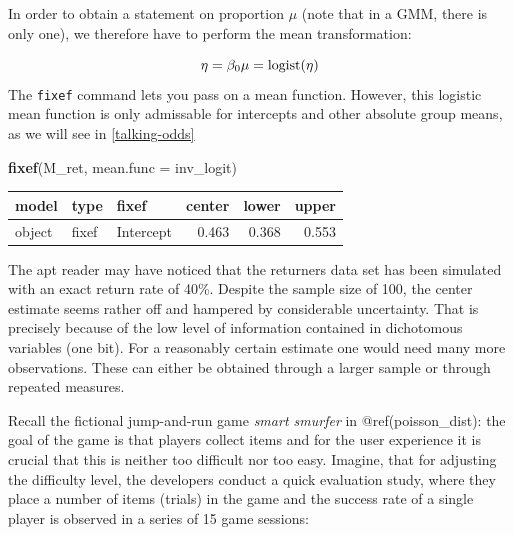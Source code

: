 \documentclass[]{svmono}
\newenvironment{Shaded}{\begin{snugshade}}{\end{snugshade}}
\newcommand{\KeywordTok}[1]{\textcolor[rgb]{0.13,0.29,0.53}{\textbf{#1}}}
\newcommand{\DataTypeTok}[1]{\textcolor[rgb]{0.13,0.29,0.53}{#1}}
\newcommand{\DecValTok}[1]{\textcolor[rgb]{0.00,0.00,0.81}{#1}}
\newcommand{\StringTok}[1]{\textcolor[rgb]{0.31,0.60,0.02}{#1}}
\newcommand{\OperatorTok}[1]{\textcolor[rgb]{0.81,0.36,0.00}{\textbf{#1}}}
\newcommand{\NormalTok}[1]{#1}
\begin{document}
In order to obtain a statement on proportion \(\mu\) (note that in a
GMM, there is only one), we therefore have to perform the mean
transformation:

\[
\eta = \beta_0\\
\mu = \textrm{logist}(\eta)
\] The \texttt{fixef} command lets you pass on a mean function. However,
this logistic mean function is only admissable for intercepts and other
absolute group means, as we will see in \ref{talking-odds}

\begin{Shaded}
\begin{Highlighting}[]
\KeywordTok{fixef}\NormalTok{(M_ret, }\DataTypeTok{mean.func =}\NormalTok{ inv_logit)}
\end{Highlighting}
\end{Shaded}

\begin{longtable}[]{@{}lllrrr@{}}
\toprule
model & type & fixef & center & lower & upper\tabularnewline
\midrule
\endhead
object & fixef & Intercept & 0.463 & 0.368 & 0.553\tabularnewline
\bottomrule
\end{longtable}

The apt reader may have noticed that the returners data set has been
simulated with an exact return rate of 40\%. Despite the sample size of
100, the center estimate seems rather off and hampered by considerable
uncertainty. That is precisely because of the low level of information
contained in dichotomous variables (one bit). For a reasonably certain
estimate one would need many more observations. These can either be
obtained through a larger sample or through repeated measures.

Recall the fictional jump-and-run game \emph{smart smurfer} in
@ref(poisson\_dist): the goal of the game is that players collect items
and for the user experience it is crucial that this is neither too
difficult nor too easy. Imagine, that for adjusting the difficulty
level, the developers conduct a quick evaluation study, where they place
a number of items (trials) in the game and the success rate of a single
player is observed in a series of 15 game sessions:

\begin{Shaded}
\end{Shaded}
\end{document}
